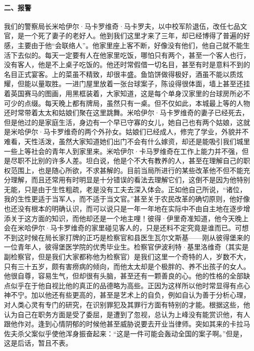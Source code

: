 \paragraph*{二、报警}
\par 我们的警察局长米哈伊尔·马卡罗维奇·马卡罗夫，以中校军阶退伍，改任七品文官，是一个死了妻子的老好人。他到我们这里才来了三年，却已经博得了普遍的好感，主要由于他“会联络人”。他家里座上客不断，好像没有他们，他自己就不能生活下去似的。每天一定要有人在他家里吃饭，哪怕只有两个，甚至一个客人也行，没有客人，他是不上桌子吃饭的。他还时常假借一切名目，甚至有时是意料不到的名目正式宴客。上的菜虽不精致，却很丰盛。鱼馅饼做得极好，酒虽不能以质炫耀，但能以量取胜。一进门屋里放着一张台球案子，陈设得很体面，墙上甚至还挂着英国赛马的图画，用黑框装着，大家知道，这是每个单身汉家里的台球房所必不可少的点缀。每天晚上都有牌局，虽然只有一桌。但不仅如此，本城最上等的人物还时常带着太太和姑娘们聚在这里跳舞。米哈伊尔·马卡罗维奇的妻子已经死去，但是他过的是家庭生活，身边有一个早已守寡的女儿，她自己也有两个姑娘，这就是米哈伊尔·马卡罗维奇的两个外孙女。姑娘们已经成人，修完了学业，外貌并不难看，天性活泼，虽然大家知道她们出门不会有什么嫁资，却还是能吸引我们城里一些上等社会的青年人到家里来。米哈伊尔·卡马罗维奇在工作上能力并不强，但是尽职不比别的许多人差。坦白说，他是个不大有教养的人，甚至在理解自己的职权范围上，也是随心所欲，不求甚解的。目前当局所进行的某些改革他不但不能充分理解，而且还常用有时明显是十分错误的看法去理解它们，这倒不是因为他特别无能，只是由于生性粗疏，老是没有工夫去深入体会。正如他自己所说，“诸位，我的生性更适于当军人，而不适于当文官。”甚至关于农民改革的确切原则，他好像也还没有根本的明确认识，而可以说只是一年一年地在实际中不由自主地在逐步增添关于这方面的知识，而他却还是一个地主哩！彼得·伊里奇准知道，他今天晚上会在米哈伊尔·马卡罗维奇的家里碰见客人的，只是还料不定究竟是谁而已。可想不到这时候在局长家打牌的正巧是检察官和县医生瓦尔文斯基——刚从彼得堡来的一位青年人，彼得堡医学院的优秀毕业生。检察官伊波利特·基里洛维奇（其实是副检察官，但是我们大家都称他为检察官）是我们这里一个奇特的人，岁数不大，只有三十五岁，颇有害痨病的倾向，而他太太却是个极胖的、养不出孩子的女人。他很自尊，容易生气，但却很有头脑，甚至还有一颗善良的心。他的性格的全部缺点似乎在于他自视比他的真正的品德略为高些。正因为这样所以他时常显得有点心神不宁。加以他还有些更高的，甚至是艺术上的自负，例如自认为善于分析心理，对人类心灵有专门的研究，在识别罪犯及其罪行方面有特别的才能。根据这些，他认为自己在职务方面是受了委屈，是遭到了忽视，总认为上峰没有能赏识他，有人跟他作对。逢到心情阴郁的时候他甚至威胁说要去开业当律师。突如其来的卡拉马佐夫杀父案似乎使他浑身振奋起来：“这是一件可能会轰动全国的案子啊。”但是，这是后话，暂且不表。
